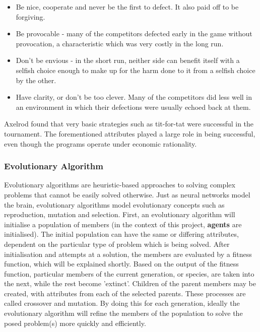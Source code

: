 \documentclass[12pt,a4paper]{article}
\begin{document}
\begin{itemize}
  \item Be nice, cooperate and never be the first to defect. It also paid off to be forgiving.
  \item Be provocable - many of the competitors defected early in the game without provocation, a characteristic which was very costly in the long run.
  \item Don't be envious - in the short run, neither side can benefit itself with a selfish choice enough to make up for the harm done to it from a selfish choice by the other.
  \item Have clarity, or don't be too clever. Many of the competitors did less well in an environment in which their defections were usually echoed back at them. \\
\end{itemize}

Axelrod found that very basic strategies such as tit-for-tat were successful in the tournament. The forementioned attributes played a large role in being successful, even though the programs operate under economic rationality.

\subsubsection{Evolutionary Algorithm}
Evolutionary algorithms are heuristic-based approaches to solving complex problems that cannot be easily solved otherwise. Just as neural networks model the brain, evolutionary algorithms model evolutionary concepts such as reproduction, mutation and selection. First, an evolutionary algorithm will initialise a population of members (in the context of this project, \textbf{agents} are initialised). The initial population can have the same or differing attributes, dependent on the particular type of problem which is being solved. After initialisation and attempts at a solution, the members are evaluated by a fitness function, which will be explained shortly. Based on the output of the fitness function, particular members of the current generation, or species, are taken into the next, while the rest become 'extinct'. Children of the parent members may be created, with attributes from each of the selected parents. These processes are called crossover and mutation. By doing this for each generation, ideally the evolutionary algorithm will refine the members of the population to solve the posed problem(s) more quickly and efficiently.
\end{document}
